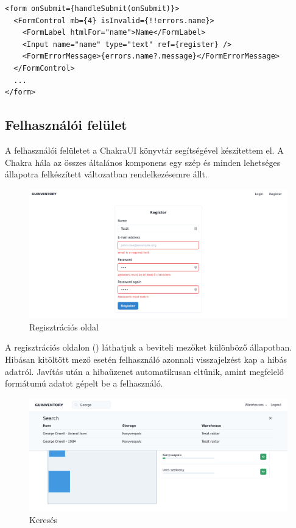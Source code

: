{\begin{lstlisting}[style=ES6, caption={Form}]
<form onSubmit={handleSubmit(onSubmit)}>
  <FormControl mb={4} isInvalid={!!errors.name}>
    <FormLabel htmlFor="name">Name</FormLabel>
    <Input name="name" type="text" ref={register} />
    <FormErrorMessage>{errors.name?.message}</FormErrorMessage>
  </FormControl>
  ...
</form>
\end{lstlisting}


\subsection{Felhasználói felület}
A felhasználói felületet a ChakraUI könyvtár segítségével készítettem el.
A Chakra hála az összes általános komponens egy szép és minden lehetséges állapotra felkészített változatban rendelkezésemre állt.

\begin{figure}[!ht]
  \centering
  \includegraphics[width=150mm, keepaspectratio]{figures/reg.png}
  \caption{Regisztrációs oldal}
  \label{fig:reg}
\end{figure}

A regisztrációs oldalon () láthatjuk a beviteli mezőket különböző állapotban.
Hibásan kitöltött mező esetén felhasználó azonnali visszajelzést kap a hibás adatról.
Javítás után a hibaüzenet automatikusan eltűnik, amint megfelelő formátumú adatot gépelt be a felhasználó.

\begin{figure}[!ht]
  \centering
  \includegraphics[width=150mm, keepaspectratio]{figures/search.png}
  \caption{Keresés}
  \label{fig:search}
\end{figure}

}
